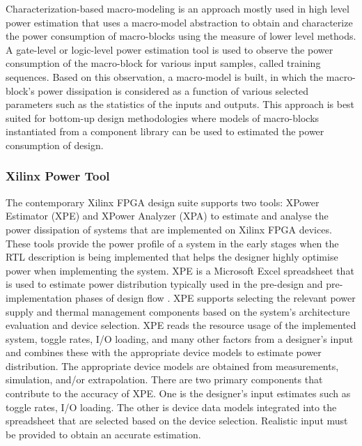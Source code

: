 Characterization-based macro-modeling is an approach mostly used in high level power estimation that uses a macro-model abstraction to obtain and characterize the power consumption of macro-blocks using the measure of lower level methods.
A gate-level or logic-level power estimation tool is used to observe the power consumption of the macro-block for various input samples, called training sequences.
Based on this observation, a macro-model is built, in which the macro-block's power dissipation is considered as a function of various selected parameters such as the statistics of the inputs and outputs.
This approach is best suited for bottom-up design methodologies where models of macro-blocks instantiated from a component library can be used to estimated the power consumption of design.

\subsubsection{Xilinx Power Tool}

The contemporary Xilinx FPGA design suite supports two tools: XPower Estimator (XPE) and  XPower Analyzer (XPA) to estimate and analyse the power dissipation of systems that are implemented on Xilinx FPGA devices.
These tools provide the power profile of a system in the early stages when the RTL description is being implemented that helps the designer highly optimise power when implementing the system.
XPE is a Microsoft Excel spreadsheet that is used to estimate power distribution typically used in the pre-design and pre-implementation phases of design flow \cite{XPowerEstimator2011} . 
XPE supports selecting the relevant power supply and thermal management components based on the system's architecture evaluation and device selection.
XPE reads the resource usage of the implemented system, toggle rates, I/O loading, and many other factors from a designer's input and combines these with the appropriate device models to estimate power distribution. 
The appropriate device models are obtained from measurements, simulation, and/or extrapolation.
There are two primary components that contribute to the accuracy of XPE. 
One is the designer's input estimates such as toggle rates, I/O loading.
The other is device data models integrated into the spreadsheet that are selected based on the device selection.
Realistic input must be provided to obtain an accurate estimation.

